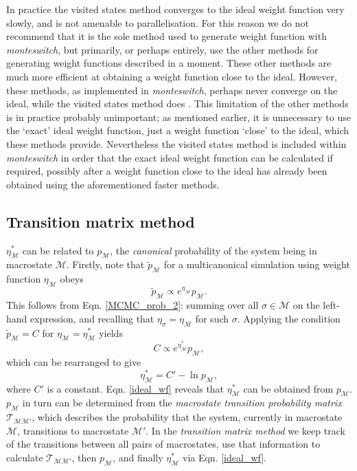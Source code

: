 \documentclass{report}
\begin{document}
In practice the visited states method converges to the ideal weight function very slowly, and is not amenable to parallelisation. 
For this reason we do not recommend that it is the sole method used to 
generate weight function with \emph{monteswitch}, but primarily, or perhaps entirely, use the other methods for generating weight functions described 
in a moment. These other methods are much more efficient at obtaining a weight function close to the ideal. However, these methods, as implemented in 
\emph{monteswitch}, perhaps never converge on the ideal, while the visited states method does \cite{Smith_1995}. 
This limitation of the other methods is in practice probably
unimportant; as mentioned earlier, it is unnecessary to use the `exact' ideal weight function, just a weight function `close' to the ideal, which
these methods provide. Nevertheless the visited states method is included within \emph{monteswitch} in order that the exact ideal weight function can
be calculated if required, possibly after a weight function close to the ideal has already been obtained using the aforementioned faster methods.


\subsection{Transition matrix method}\label{sec:transition_matrix}
$\eta_{\mathcal{M}}^*$ can be related to $p_{\mathcal{M}}$, the \emph{canonical} probability of the system being in macrostate $\mathcal{M}$. Firstly,
note that $\tilde{p}_{\mathcal{M}}$ for a multicanonical simulation using weight function $\eta_{\mathcal{M}}$ obeys
\begin{equation}
\tilde{p}_{\mathcal{M}}\propto e^{\eta_{\mathcal{M}}}p_{\mathcal{M}}.
\end{equation}
This follows from Eqn. \eqref{MCMC_prob_2}: summing over all $\sigma\in\mathcal{M}$ on the left-hand expression, and recalling that 
$\eta_{\sigma}=\eta_{\mathcal{M}}$ for such $\sigma$. Applying the condition $\tilde{p}_{\mathcal{M}}=C$ for $\eta_{\mathcal{M}}=\eta_{\mathcal{M}}^*$ yields
\begin{equation}
C\propto e^{\eta^*_{\mathcal{M}}}p_{\mathcal{M}},
\end{equation}
which can be rearranged to give
\begin{equation}\label{ideal_wf}
\eta^*_{\mathcal{M}}=C'-\ln p_{\mathcal{M}},
\end{equation}
where $C'$ is a constant. Eqn. \eqref{ideal_wf} reveals that $\eta^*_{\mathcal{M}}$ can be obtained from $p_{\mathcal{M}}$. $p_{\mathcal{M}}$ 
in turn can be determined from the \emph{macrostate transition probability matrix} $\mathcal{T}_{\mathcal{MM}'}$, which describes the probability that
the system, currently in macrostate $\mathcal{M}$, transitions to macrostate $\mathcal{M}'$. 
In the \emph{transition matrix method} \cite{Smith_1995,Fitzgerald_1999}
we keep track of the transitions between all pairs of macrostates, use that information to calculate 
$\mathcal{T}_{\mathcal{MM}'}$, then $p_{\mathcal{M}}$, and finally $\eta_{\mathcal{M}}^*$ via Eqn. \eqref{ideal_wf}.
\end{document}
